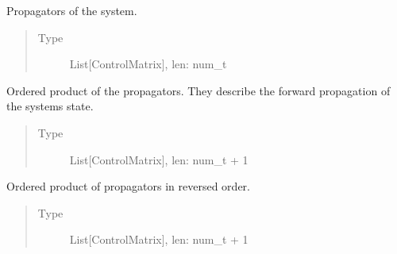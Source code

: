 \documentclass[letterpaper,10pt,english]{sphinxmanual}
\begin{document}
\begin{fulllineitems}
\begin{fulllineitems}
\begin{quote}
\begin{description}
\end{description}\end{quote}

\end{fulllineitems}


\begin{fulllineitems}
\label{\detokenize{qsim:qsim.solver_algorithms.Solver._prop}}
Propagators of the system.
\begin{quote}\begin{description}
\item[{Type}] \leavevmode
List{[}ControlMatrix{]}, len: num\_t

\end{description}\end{quote}

\end{fulllineitems}


\begin{fulllineitems}
\label{\detokenize{qsim:qsim.solver_algorithms.Solver._fwd_prop}}
Ordered product of the propagators. They describe the forward
propagation of the systems state.
\begin{quote}\begin{description}
\item[{Type}] \leavevmode
List{[}ControlMatrix{]}, len: num\_t + 1

\end{description}\end{quote}

\end{fulllineitems}


\begin{fulllineitems}
\label{\detokenize{qsim:qsim.solver_algorithms.Solver._reversed_prop}}
Ordered product of propagators in reversed order.
\begin{quote}\begin{description}
\item[{Type}] \leavevmode
List{[}ControlMatrix{]}, len: num\_t + 1


\end{description}
\end{quote}
\end{fulllineitems}
\end{fulllineitems}
\end{document}
